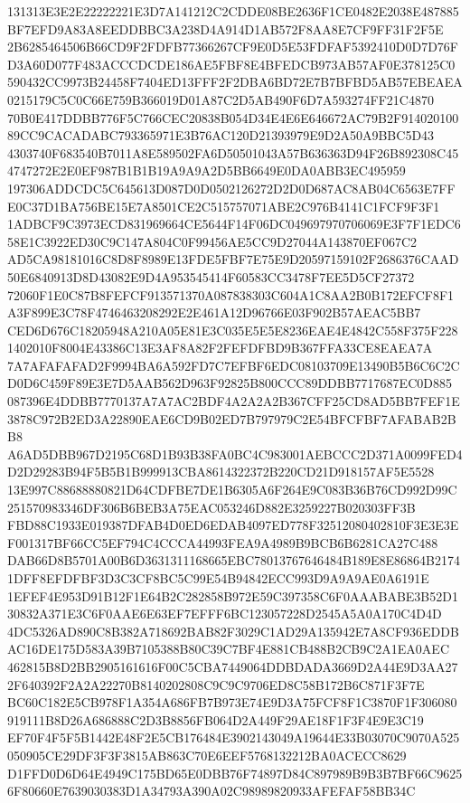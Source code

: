 \documentclass[UTF8,fontset=fandol,zihao=-4,a4paper]{ctexart}
\begin{document}
{{131313E3E2E22222221E3D7A141212C2CDDE08BE2636F1CE0482E2038E487885BF7EFD9A83A8EEDDBBC3A238D4A914D1AB572F8AA8E7CF9FF31F2F5E
2B6285464506B66CD9F2FDFB77366267CF9E0D5E53FDFAF5392410D0D7D76FD3A60D077F483ACCCDCDE186AE5FBF8E4BFEDCB973AB57AF0E378125C0
590432CC9973B24458F7404ED13FFF2F2DBA6BD72E7B7BFBD5AB57EBEAEA0215179C5C0C66E759B366019D01A87C2D5AB490F6D7A593274FF21C4870
70B0E417DDBB776F5C766CEC20838B054D34E4E6E646672AC79B2F91402010089CC9CACADABC793365971E3B76AC120D21393979E9D2A50A9BBC5D43
4303740F683540B7011A8E589502FA6D50501043A57B636363D94F26B892308C454747272E2E0EF987B1B1B19A9A9A2D5BB6649E0DA0ABB3EC495959
197306ADDCDC5C645613D087D0D0502126272D2D0D687AC8AB04C6563E7FFE0C37D1BA756BE15E7A8501CE2C515757071ABE2C976B4141C1FCF9F3F1
1ADBCF9C3973ECD831969664CE5644F14F06DC049697970706069E3F7F1EDC658E1C3922ED30C9C147A804C0F99456AE5CC9D27044A143870EF067C2
AD5CA98181016C8D8F8989E13FDE5FBF7E75E9D20597159102F2686376CAAD50E6840913D8D43082E9D4A953545414F60583CC3478F7EE5D5CF27372
72060F1E0C87B8FEFCF913571370A087838303C604A1C8AA2B0B172EFCF8F1A3F899E3C78F4746463208292E2E461A12D96766E03F902B57AEAC5BB7
CED6D676C18205948A210A05E81E3C035E5E5E8236EAE4E4842C558F375F2281402010F8004E43386C13E3AF8A82F2FEFDFBD9B367FFA33CE8EAEA7A
7A7AFAFAFAD2F9994BA6A592FD7C7EFBF6EDC08103709E13490B5B6C6C2CD0D6C459F89E3E7D5AAB562D963F92825B800CCC89DDBB7717687EC0D885
087396E4DDBB7770137A7A7AC2BDF4A2A2A2B367CFF25CD8AD5BB7FEF1E3878C972B2ED3A22890EAE6CD9B02ED7B797979C2E54BFCFBF7AFABAB2BB8
A6AD5DBB967D2195C68D1B93B38FA0BC4C983001AEBCCC2D371A0099FED4D2D29283B94F5B5B1B999913CBA8614322372B220CD21D918157AF5E5528
13E997C88688880821D64CDFBE7DE1B6305A6F264E9C083B36B76CD992D99C251570983346DF306B6BEB3A75EAC053246D882E3259227B020303FF3B
FBD88C1933E019387DFAB4D0ED6EDAB4097ED778F32512080402810F3E3E3EF001317BF66CC5EF794C4CCCA44993FEA9A4989B9BCB6B6281CA27C488
DAB66D8B5701A00B6D3631311168665EBC78013767646484B189E8E86864B21741DFF8EFDFBF3D3C3CF8BC5C99E54B94842ECC993D9A9A9AE0A6191E
1EFEF4E953D91B12F1E64B2C282858B972E59C397358C6F0AAABABE3B52D130832A371E3C6F0AAE6E63EF7EFFF6BC123057228D2545A5A0A170C4D4D
4DC5326AD890C8B382A718692BAB82F3029C1AD29A135942E7A8CF936EDDBAC16DE175D583A39B7105388B80C39C7BF4E881CB488B2CB9C2A1EA0AEC
462815B8D2BB2905161616F00C5CBA7449064DDBDADA3669D2A44E9D3AA272F640392F2A2A22270B8140202808C9C9C9706ED8C58B172B6C871F3F7E
BC60C182E5CB978F1A354A686FB7B973E74E9D3A75FCF8F1C3870F1F306080919111B8D26A686888C2D3B8856FB064D2A449F29AE18F1F3F4E9E3C19
EF70F4F5F5B1442E48F2E5CB176484E3902143049A19644E33B03070C9070A525050905CE29DF3F3F3815AB863C70E6EEF5768132212BA0ACECC8629
D1FFD0D6D64E4949C175BD65E0DBB76F74897D84C897989B9B3B7BF66C96256F80660E7639030383D1A34793A390A02C98989820933AFEFAF58BB34C
}}
\end{document}
